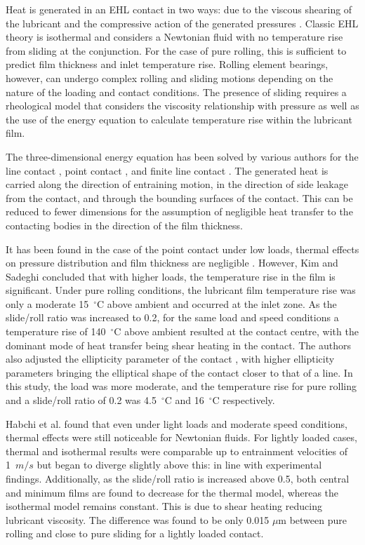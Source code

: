 Heat is generated in an EHL contact in two ways: due to the viscous shearing of the lubricant and the compressive action of the generated pressures \cite{Mohammadpour2015c}. Classic EHL theory is isothermal and considers a Newtonian fluid with no temperature rise from sliding at the conjunction. For the case of pure rolling, this is sufficient to predict film thickness and inlet temperature rise. Rolling element bearings, however, can undergo complex rolling and sliding motions depending on the nature of the loading and contact conditions. The presence of sliding requires a rheological model that considers the viscosity relationship with pressure as well as the use of the energy equation to calculate temperature rise within the lubricant film.

The three-dimensional energy equation has been solved by various authors for the line contact \cite{Yang2001}, point contact \cite{Kim1993},\cite{Kim1993a} and finite line contact \cite{Liu2002}. The generated heat is carried along the direction of entraining motion, in the direction of side leakage from the contact, and through the bounding surfaces of the contact. This can be reduced to fewer dimensions for the assumption of negligible heat transfer to the contacting bodies in the direction of the film thickness.

It has been found in the case of the point contact under low loads, thermal effects on pressure distribution and film thickness are negligible \cite{ZhuDong1984}. However, Kim and Sadeghi \cite{Kim1993} concluded that with higher loads, the temperature rise in the film is significant. Under pure rolling conditions, the lubricant film temperature rise was only a moderate 15~${ }^{\circ}\mathrm{C}$ above ambient and occurred at the inlet zone. As the slide/roll ratio was increased to 0.2, for the same load and speed conditions a temperature rise of 140~${ }^{\circ}\mathrm{C}$ above ambient resulted at the contact centre, with the dominant mode of heat transfer being shear heating in the contact. The authors also adjusted the ellipticity parameter of the contact \cite{Kim1993a}, with higher ellipticity parameters bringing the elliptical shape of the contact closer to that of a line. In this study, the load was more moderate, and the temperature rise for pure rolling and a slide/roll ratio of 0.2 was 4.5~${ }^{\circ}\mathrm{C}$ and 16~${ }^{\circ}\mathrm{C}$ respectively.

Habchi et al. \cite{Habchi2008} found that even under light loads and moderate speed conditions, thermal effects were still noticeable for Newtonian fluids. For lightly loaded cases, thermal and isothermal results were comparable up to entrainment velocities of 1~$m/s$ but began to diverge slightly above this: in line with experimental findings. Additionally, as the slide/roll ratio is increased above 0.5, both central and minimum films are found to decrease for the thermal model, whereas the isothermal model remains constant. This is due to shear heating reducing lubricant viscosity. The difference was found to be only 0.015 $\mu \mathrm{m}$ between pure rolling and close to pure sliding for a lightly loaded contact.

